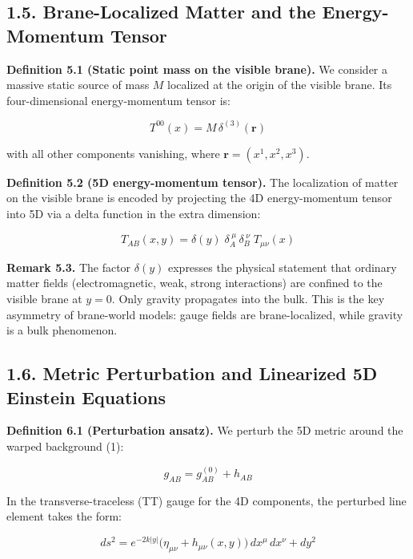 \documentclass[
  11pt,
]{article}
\begin{document}
\bigskip

\hypertarget{brane-localized-matter-and-the-energy-momentum-tensor}{%
\subsection{1.5. Brane-Localized Matter and the Energy-Momentum
Tensor}\label{brane-localized-matter-and-the-energy-momentum-tensor}}

\textbf{Definition 5.1 (Static point mass on the visible brane).} We
consider a massive static source of mass \(M\) localized at the origin
of the visible brane. Its four-dimensional energy-momentum tensor is:

\[T^{00}(x) = M\,\delta^{(3)}(\mathbf{r}) \tag{16}\]

with all other components vanishing, where
\(\mathbf{r} = (x^1, x^2, x^3)\).

\textbf{Definition 5.2 (5D energy-momentum tensor).} The localization of
matter on the visible brane is encoded by projecting the 4D
energy-momentum tensor into 5D via a delta function in the extra
dimension:

\[T_{AB}(x, y) = \delta(y)\;\delta_A^{\;\mu}\,\delta_B^{\;\nu}\;T_{\mu\nu}(x) \tag{17}\]

\textbf{Remark 5.3.} The factor \(\delta(y)\) expresses the physical
statement that ordinary matter fields (electromagnetic, weak, strong
interactions) are confined to the visible brane at \(y = 0\). Only
gravity propagates into the bulk. This is the key asymmetry of
brane-world models: gauge fields are brane-localized, while gravity is a
bulk phenomenon.

\bigskip

\hypertarget{metric-perturbation-and-linearized-5d-einstein-equations}{%
\subsection{1.6. Metric Perturbation and Linearized 5D Einstein
Equations}\label{metric-perturbation-and-linearized-5d-einstein-equations}}

\textbf{Definition 6.1 (Perturbation ansatz).} We perturb the 5D metric
around the warped background (1):

\[g_{AB} = g_{AB}^{(0)} + h_{AB} \tag{18}\]

In the transverse-traceless (TT) gauge for the 4D components, the
perturbed line element takes the form:

\[ds^2 = e^{-2k|y|}\bigl(\eta_{\mu\nu} + h_{\mu\nu}(x, y)\bigr)\,dx^\mu\,dx^\nu + dy^2 \tag{19}\]
\end{document}
